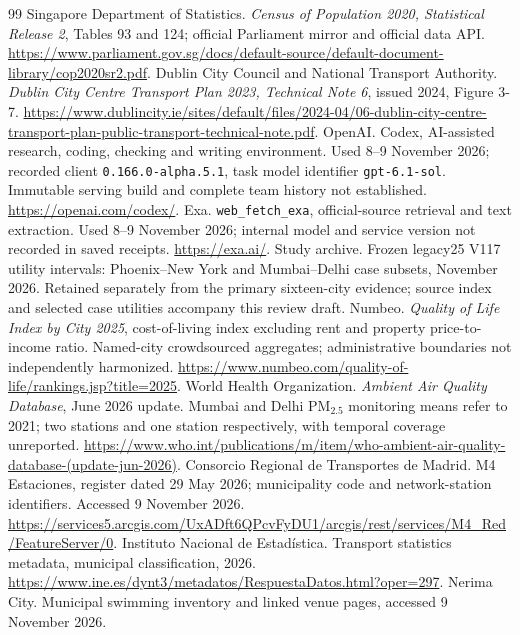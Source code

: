 \begin{thebibliography}{99}
 Singapore Department of Statistics. \textit{Census of
Population 2020, Statistical Release 2}, Tables 93 and 124; official Parliament
mirror and official data API.
\url{https://www.parliament.gov.sg/docs/default-source/default-document-library/cop2020sr2.pdf}.
 Dublin City Council and National Transport Authority.
\textit{Dublin City Centre Transport Plan 2023, Technical Note 6},
issued 2024, Figure 3-7.
\url{https://www.dublincity.ie/sites/default/files/2024-04/06-dublin-city-centre-transport-plan-public-transport-technical-note.pdf}.
\CaseReferences
{} OpenAI. Codex, AI-assisted research, coding, checking and writing
environment. Used 8--9 November 2026; recorded client
\texttt{0.166.0-alpha.5.1}, task model identifier \texttt{gpt-6.1-sol}.
Immutable serving build and complete team history not established.
\url{https://openai.com/codex/}.
 Exa. \texttt{web\_fetch\_exa}, official-source retrieval and text
extraction. Used 8--9 November 2026; internal model and service version not
recorded in saved receipts. \url{https://exa.ai/}.
 Study archive. Frozen legacy25 V117 utility intervals:
Phoenix--New York and Mumbai--Delhi case subsets, November 2026. Retained
separately from the primary sixteen-city evidence; source index and selected
case utilities accompany this review draft.
 Numbeo. \textit{Quality of Life Index by City 2025},
cost-of-living index excluding rent and property price-to-income ratio.
Named-city crowdsourced aggregates; administrative boundaries not
independently harmonized.
\url{https://www.numbeo.com/quality-of-life/rankings.jsp?title=2025}.
 World Health Organization. \textit{Ambient Air Quality Database},
June 2026 update. Mumbai and Delhi PM$_{2.5}$ monitoring means refer to 2021;
two stations and one station respectively, with temporal coverage unreported.
\url{https://www.who.int/publications/m/item/who-ambient-air-quality-database-(update-jun-2026)}.
 Consorcio Regional de Transportes de Madrid. M4 Estaciones, register dated 29 May 2026; municipality code and network-station identifiers. Accessed 9 November 2026.
\url{https://services5.arcgis.com/UxADft6QPcvFyDU1/arcgis/rest/services/M4_Red/FeatureServer/0}.
 Instituto Nacional de Estad\'istica. Transport statistics metadata, municipal classification, 2026.
\url{https://www.ine.es/dynt3/metadatos/RespuestaDatos.html?oper=297}.
 Nerima City. Municipal swimming inventory and linked venue pages, accessed 9 November 2026.

\end{thebibliography}
